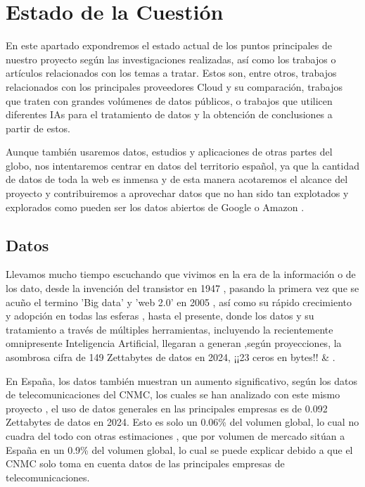 \chapter{Estado de la Cuestión}
\label{cap:estadoDeLaCuestion}

En este apartado expondremos el estado actual de los puntos principales de nuestro proyecto según las investigaciones realizadas, así como los trabajos o artículos relacionados con los temas a tratar. Estos son, entre otros, trabajos relacionados con los principales proveedores Cloud y su comparación, trabajos que traten con grandes volúmenes de datos públicos, o trabajos que utilicen diferentes IAs para el tratamiento de datos y la obtención de conclusiones a partir de estos. 

Aunque también usaremos datos, estudios y aplicaciones de otras partes del globo, nos intentaremos centrar en datos del territorio español, ya que la cantidad de datos de toda la web es inmensa y de esta manera acotaremos el alcance del proyecto y contribuiremos a aprovechar datos que no han sido tan explotados y explorados como pueden ser los datos abiertos de Google \citep{googleDataCommon} o Amazon \citep{AWSDataCommon} . 

\section{Datos}

Llevamos mucho tiempo escuchando que vivimos en la era de la información o de los dato, desde la invención del transistor en 1947 \citep{wikiInformationAge}, pasando la primera vez que se acuño el termino 'Big data' y 'web 2.0' en 2005 \citep{HistoryOfBigData}, así como su rápido crecimiento y adopción en todas las esferas \citep{brown2011you}, hasta el presente, donde los datos y su tratamiento a través de múltiples herramientas, incluyendo la recientemente omnipresente Inteligencia Artificial, llegaran a generan ,según proyecciones, la asombrosa cifra de 149 Zettabytes de datos en 2024, ¡¡23 ceros en bytes!! \citep{BigDataStatista} \& \citep{BigDataStadisticsMarket}.

En España, los datos también muestran un aumento significativo, según los datos de telecomunicaciones del CNMC, los cuales se han analizado con este mismo proyecto \citep{DatosGeneralesCNMC}, el uso de datos generales en las principales empresas es de 0.092 Zettabytes de datos en 2024.
Esto es solo un 0.06\% del volumen global, lo cual no cuadra del todo con otras estimaciones \citep{DatosMercadosEspanna}, que por volumen de mercado sitúan a España en un 0.9\% del volumen global, lo cual se puede explicar debido a que el CNMC solo toma en cuenta datos de las principales empresas de telecomunicaciones. 

